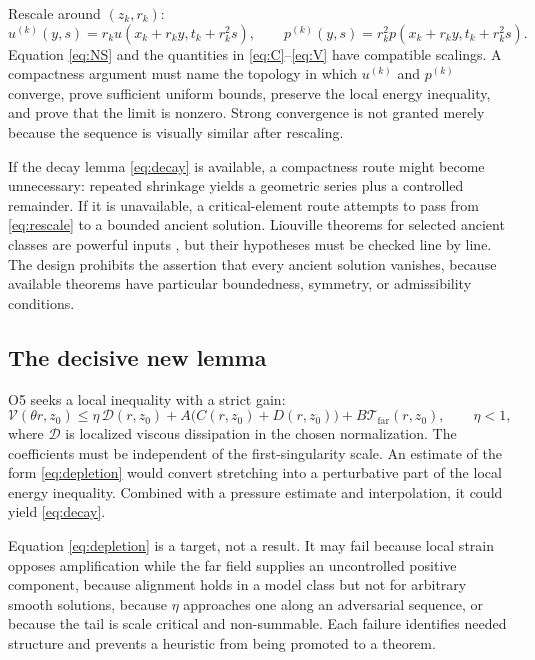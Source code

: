 \documentclass[conference]{../../../../Conference-LaTeX-template_10-17-19/IEEEtran}
\begin{document}
Rescale around $(z_k,r_k)$:
\begin{equation}
u^{(k)}(y,s)=r_k u(x_k+r_ky,t_k+r_k^2s),\qquad
p^{(k)}(y,s)=r_k^2p(x_k+r_ky,t_k+r_k^2s).
\label{eq:rescale}
\end{equation}
Equation \eqref{eq:NS} and the quantities in \eqref{eq:C}--\eqref{eq:V} have compatible scalings. A compactness argument must name the topology in which $u^{(k)}$ and $p^{(k)}$ converge, prove sufficient uniform bounds, preserve the local energy inequality, and prove that the limit is nonzero. Strong convergence is not granted merely because the sequence is visually similar after rescaling.

If the decay lemma \eqref{eq:decay} is available, a compactness route might become unnecessary: repeated shrinkage yields a geometric series plus a controlled remainder. If it is unavailable, a critical-element route attempts to pass from \eqref{eq:rescale} to a bounded ancient solution. Liouville theorems for selected ancient classes are powerful inputs \cite{knss}, but their hypotheses must be checked line by line. The design prohibits the assertion that every ancient solution vanishes, because available theorems have particular boundedness, symmetry, or admissibility conditions.

\subsection{The decisive new lemma}
O5 seeks a local inequality with a strict gain:
\begin{equation}
\mathcal V(\theta r,z_0)
\le \eta\,\mathcal D(r,z_0)
+A\bigl(C(r,z_0)+D(r,z_0)\bigr)
+B\mathcal T_{\mathrm{far}}(r,z_0),
\qquad \eta<1,
\label{eq:depletion}
\end{equation}
where $\mathcal D$ is localized viscous dissipation in the chosen normalization. The coefficients must be independent of the first-singularity scale. An estimate of the form \eqref{eq:depletion} would convert stretching into a perturbative part of the local energy inequality. Combined with a pressure estimate and interpolation, it could yield \eqref{eq:decay}.

Equation \eqref{eq:depletion} is a target, not a result. It may fail because local strain opposes amplification while the far field supplies an uncontrolled positive component, because alignment holds in a model class but not for arbitrary smooth solutions, because $\eta$ approaches one along an adversarial sequence, or because the tail is scale critical and non-summable. Each failure identifies needed structure and prevents a heuristic from being promoted to a theorem.
\end{document}
